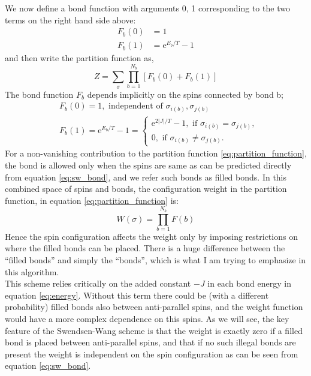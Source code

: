 \documentclass[a4paper,8pt]{article}
\begin{document}
We now define a bond function with arguments 0, 1 corresponding to the two terms on the right
hand side above:
\begin{align}
    F_b(0) &= 1 \\
    F_b(1) &= \mathrm{e}^{E_b/T} - 1
\end{align}
and then write the partition function as, 
\begin{equation}
    Z=\sum_\sigma \prod_{b=1}^{N_b}\left[F_b(0)+F_b(1)\right] \label{eq:partition_function}
\end{equation}
The bond function $F_b$ depends implicitly on the spins connected by bond b;
\begin{equation}
\begin{aligned}
    & F_b(0) = 1, \text{ independent of } \sigma_{i(b)}, \sigma_{j(b)} \\
    & F_b(1) = \mathrm{e}^{E_b / T} - 1 = \left\{
        \begin{array}{l}
            \mathrm{e}^{2|J| / T} - 1, \text{ if } \sigma_{i(b)} = \sigma_{j(b)}, \\
            0, \text{ if } \sigma_{i(b)} \neq \sigma_{j(b)} .
        \end{array}
    \right.   \label{eq:sw_bond}
\end{aligned}
\end{equation}
For a non-vanishing contribution to the partition function \ref{eq:partition_function}, the bond is allowed only when the spins are same as can be predicted directly from equation \ref{eq:sw_bond}, and we refer such bonds as filled bonds. In this combined space of spins and bonds, the configuration weight in the partition function, in equation \ref{eq:partition_function} is:
\begin{equation}
    W(\sigma) = \prod_{b=1}^{N_b} F(b)  \label{eq:weight}
\end{equation}
Hence the spin configuration affects the weight only by imposing restrictions on where the filled bonds can be placed. There is a huge difference between the \enquote{filled bonds} and simply the \enquote{bonds}, which is what I am trying to emphasize in this algorithm. \\

This scheme relies critically on the added constant $-J$ in each bond energy in equation \ref{eq:energy}. Without this term there could be (with a different probability) filled bonds also between anti-parallel spins, and the weight function would have a more complex dependence on this spins. As we will see, the key feature of the Swendsen-Wang scheme is that the weight is exactly zero if a filled bond is placed between anti-parallel spins, and that if no such illegal bonds are present the weight is independent on the spin configuration as can be seen from equation \ref{eq:sw_bond}.
\end{document}
